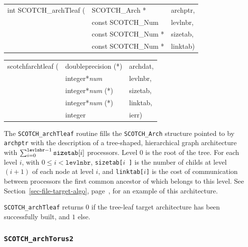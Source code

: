 \begin{itemize}
\progsyn

{\tt\begin{tabular}{l@{}ll}
int SCOTCH\_archTleaf ( & SCOTCH\_Arch *      & archptr, \\
                        & const SCOTCH\_Num   & levlnbr, \\
                        & const SCOTCH\_Num * & sizetab, \\
                        & const SCOTCH\_Num * & linktab)
\end{tabular}}

{\tt\begin{tabular}{l@{}ll}
scotchfarchtleaf ( & doubleprecision (*)   & archdat, \\
                   & integer*{\it num}     & levlnbr, \\
                   & integer*{\it num} (*) & sizetab, \\
                   & integer*{\it num} (*) & linktab, \\
                   & integer               & ierr)
\end{tabular}}

\progdes

The {\tt SCOTCH\_archTleaf} routine fills the {\tt SCOTCH\_\lbt Arch}
structure pointed to by {\tt archptr} with the description of a
tree-shaped, hierarchical graph architecture with
$\sum_{i=0}^{\mathtt{levlnbr}-1}\mathtt{sizetab}{\tt [}i{\tt ]}$
processors. Level $0$ is the root of the tree. For each level $i$,
with $0 \leq i < \mathtt{levlnbr}$, {\tt sizetab[}$i${\tt
]} is the number of childs at level $(i+1)$ of each node at level $i$,
and {\tt linktab[}$i${\tt ]} is the cost of communication between
processors the first common ancestor of which belongs to this
level. See Section~\ref{sec-file-target-algo},
page~\pageref{sec-file-target-algo}, for an example of this
architecture.

\progret

{\tt SCOTCH\_archTleaf} returns $0$ if the tree-leaf target
architecture has been successfully built, and $1$ else.
\end{itemize}

\subsubsection{{\tt SCOTCH\_archTorus2}}

